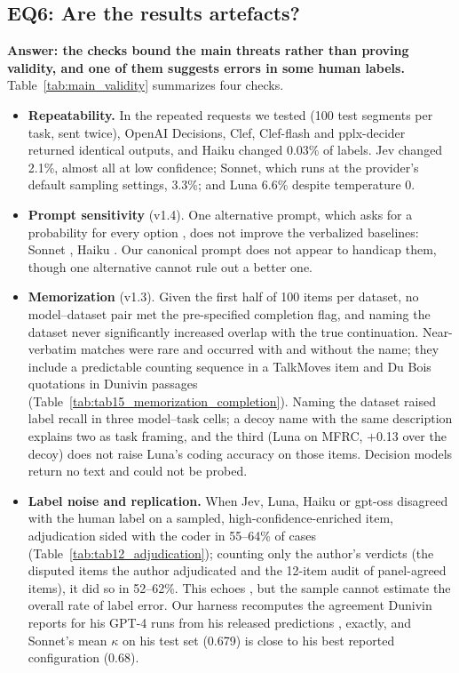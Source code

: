 \FloatBarrier
\subsection{EQ6: Are the results artefacts?}
\label{sec:eq6}

\textbf{Answer: the checks bound the main threats rather than proving validity, and one of them suggests errors in some
human labels.} Table~\ref{tab:main_validity} summarizes four checks.
\begin{itemize}
  \item \textbf{Repeatability.} In the repeated requests we tested (100 test segments per task, sent twice), OpenAI Decisions,
  Clef, Clef-flash and pplx-decider returned identical outputs, and Haiku changed 0.03\% of labels. Jev changed 2.1\%, almost
  all at low confidence; Sonnet, which runs at the provider's default sampling settings, 3.3\%; and Luna 6.6\% despite
  temperature 0.
  \item \textbf{Prompt sensitivity} (v1.4). One alternative prompt, which asks for a probability for every option
  \citep{tian2023just}, does not improve the verbalized baselines: Sonnet , Haiku
  . Our canonical prompt does not appear to handicap them, though one alternative cannot rule out a
  better one.
  \item \textbf{Memorization} (v1.3). Given the first half of 100 items per dataset, no model--dataset pair met the
  pre-specified completion flag, and naming the dataset never significantly increased overlap with the true continuation.
  Near-verbatim matches were rare and occurred with and without the name; they include a predictable counting sequence in a
  TalkMoves item and Du Bois quotations in Dunivin passages (Table~\ref{tab:tab15_memorization_completion}). Naming the
  dataset raised label recall in three model--task cells; a decoy name with the same description explains two as task
  framing, and the third (Luna on MFRC, $+$0.13 over the decoy) does not raise Luna's coding accuracy on those items. Decision
  models return no text and could not be probed.
  \item \textbf{Label noise and replication.} When Jev, Luna, Haiku or gpt-oss disagreed with the human label on a sampled,
  high-confidence-enriched item, adjudication sided with the coder in 55--64\% of cases (Table~\ref{tab:tab12_adjudication});
  counting only the author's verdicts (the disputed items the author adjudicated and the 12-item audit of panel-agreed
  items), it did so in 52--62\%. This echoes \citet{liu2026agreement}, but the sample cannot estimate the overall rate of
  label error. Our harness recomputes the agreement Dunivin reports for his GPT-4 runs from his released predictions
  \citep{dunivin2025scaling}, exactly, and Sonnet's mean $\kappa$ on his test set (0.679) is close to his best reported
  configuration (0.68).
\end{itemize}


